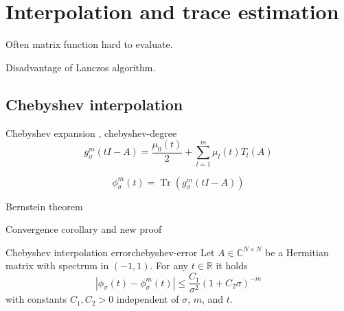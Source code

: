 \chapter{Interpolation and trace estimation}
\label{chp:2-chebyshev}

Often matrix function hard to evaluate.

Disadvantage of Lanczos algorithm.


\section{Chebyshev interpolation}
\label{sec:2-chebyshev-interpolation}

Chebyshev expansion \cite[Chapter~3]{trefethen2019chebyshev},
\gls{chebyshev-degree}
\begin{equation}
    g_{\sigma}^m(tI - A) = \frac{\mu_0(t)}{2} + \sum_{l=1}^m \mu_l(t) T_l(A)
    \label{equ:2-chebyshev-DGC-chebyshev-expansion}
\end{equation}

\begin{equation}
    \phi_{\sigma}^m(t) = \operatorname{Tr}(g_{\sigma}^m(tI - A))
    \label{equ:2-chebyshev-DGC-spectral-density-chebyshev-expansion}
\end{equation}

Bernstein theorem \cite[Theorem~73]{meinardus1967approximation} 

Convergence corollary and new proof \cite[Theorem~2]{lin2017randomized}
\begin{theorem}{Chebyshev interpolation error}{chebyshev-error}
    Let $A \in \mathbb{C}^{N \times N}$ be a Hermitian matrix with spectrum in
    $(-1, 1)$. For any $t \in \mathbb{R}$ it holds
    \begin{equation}
        \left|  \phi_{\sigma}(t) - \phi_{\sigma}^m(t) \right| \leq \frac{C_1}{\sigma^2}(1 + C_2 \sigma)^{-m}
        \label{equ:2-chebyshev-interpolation-error}
    \end{equation}
    with constants $C_1, C_2 > 0$ independent of $\sigma$, $m$, and $t$.
\end{theorem}

